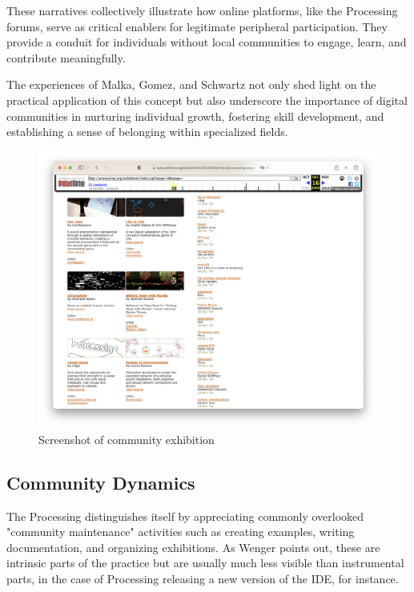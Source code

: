 These narratives collectively illustrate how online platforms, like the Processing forums, serve as critical enablers for legitimate peripheral participation. They provide a conduit for individuals without local communities to engage, learn, and contribute meaningfully. 

The experiences of Malka, Gomez, and Schwartz not only shed light on the practical application of this concept but also underscore the importance of digital communities in nurturing individual growth, fostering skill development, and establishing a sense of belonging within specialized fields.


\newpage
\begin{figure}
	\centering
	\includegraphics[width=1.0\textwidth]{images/exhibitions.png}
	\caption{Screenshot of community exhibition}
	\label{fig:website-exhibition}
\end{figure}

\subsection{Community Dynamics}
The Processing distinguishes itself by appreciating commonly overlooked "community maintenance" activities such as creating examples, writing documentation, and organizing exhibitions. As Wenger points out, these are intrinsic parts of the practice but are usually much less visible than instrumental parts, in the case of Processing releasing a new version of the IDE, for instance. \parencite[78]{wengerCommunitiesPracticeLearning1998}

